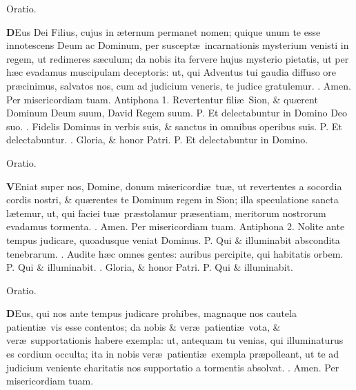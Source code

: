\documentclass[letter,11pt]{book}
\makeatletter
\DeclareRobustCommand{\Vbar}{\vers@resp{-0.1em}{V}}
\DeclareRobustCommand{\Rbar}{\vers@resp{0pt}{R}}
\newcommand{\vers@resp@sym}{\raisebox{0.2ex}{\rotatebox[origin=c]{-20}{$\m@th\rceil$}}}
\newcommand{\vers@resp}[2]{%
  {\ooalign{\hidewidth\kern#1\vers@resp@sym\hidewidth\cr#2\cr}}%
}%
\def\P{\color{Red} P. \color{black}}
\def\V{\color{Red} \Vbar . \color{black}}
\def\R{\color{Red} \Rbar . \color{black}}
\makeatother
\begin{document}
\begin{multicols}{2}
\vspace{-.5em} \begin{center} \color{Red} Oratio. \color{black} \end{center} \vspace{-.5em}
\lettrine[lines=2]{\bfseries \color{Red} D}{}Eus Dei Filius, cujus in \ae ternum permanet nomen; quique unum te esse innotescens Deum ac Dominum, per suscept\ae \ incarnationis mysterium venisti in regem, ut redimeres s\ae culum; da nobis ita fervere hujus mysterio pietatis, ut per h\ae c evadamus muscipulam deceptoris: ut, qui Adventus tui gaudia diffuso ore pr\ae cinimus, salvatos nos, cum ad judicium veneris, te judice gratulemur. \R Amen. Per misericordiam tuam.
\newline \color{Red} Antiphona 1. \color{black} Revertentur fili\ae \ Sion, \& qu\ae rent Dominum Deum suum, David Regem suum. \P Et delectabuntur in Domino Deo suo. \V Fidelis Dominus in verbis suis, \& sanctus in omnibus operibus suis. \P Et delectabuntur. \V Gloria, \& honor Patri. \P Et delectabuntur in Domino.
\vspace{-.5em} \begin{center} \color{Red} Oratio. \color{black} \end{center} \vspace{-.5em}
\lettrine[lines=2]{\bfseries \color{Red} V}{}Eniat super nos, Domine, donum misericordi\ae \ tu\ae , ut revertentes a socordia cordis nostri, \& qu\ae rentes te Dominum regem in Sion; illa speculatione sancta l\ae temur, ut, qui faciei tu\ae \ pr\ae stolamur pr\ae sentiam, meritorum nostrorum evadamus tormenta. \R Amen. Per misericordiam tuam.
\newline \color{Red} Antiphona 2. \color{black} Nolite ante tempus judicare, quoadusque veniat Dominus. \P Qui \& illuminabit abscondita tenebrarum. \V Audite h\ae c omnes gentes: auribus percipite, qui habitatis orbem. \P Qui \& illuminabit. \V Gloria, \& honor Patri. \P Qui \& illuminabit.
\vspace{-.5em} \begin{center} \color{Red} Oratio. \color{black} \end{center} \vspace{-.5em}
\lettrine[lines=2]{\bfseries \color{Red} D}{}Eus, qui nos ante tempus judicare prohibes, magnaque nos cautela patienti\ae \ vis esse contentos; da nobis \& ver\ae \ patienti\ae \ vota, \& ver\ae \ supportationis habere exempla: ut, antequam tu venias, qui illuminaturus es cordium occulta; ita in nobis ver\ae \ patienti\ae \ exempla pr\ae polleant, ut te ad judicium veniente charitatis nos supportatio a tormentis absolvat. \R Amen. Per misericordiam tuam.

\end{multicols}
\end{document}
